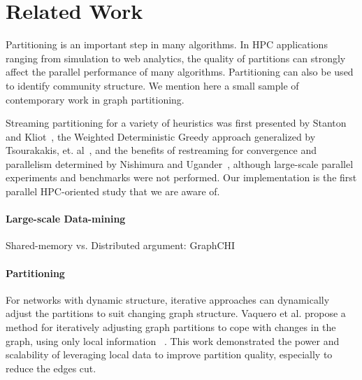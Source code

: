 \section{Related Work} \label{sec:rel}
Partitioning is an important step in many algorithms. In HPC applications ranging from simulation to web analytics, the quality of partitions can strongly affect the parallel performance of many algorithms. Partitioning can also be used to identify community structure. We mention here a small sample of contemporary work in graph partitioning.

Streaming partitioning for a variety of heuristics was first presented by Stanton and Kliot~\cite{Stanton:2012:SGP:2339530.2339722}, the Weighted Deterministic Greedy approach generalized by Tsourakakis, et. al~\cite{tsourakakis2012fennel}, and the benefits of restreaming for convergence and parallelism determined by Nishimura and Ugander~\cite{nishimura2013restream}, although large-scale parallel experiments and benchmarks were not performed. Our implementation is the first parallel HPC-oriented study that we are aware of. 

\paragraph{Large-scale Data-mining}
Shared-memory vs. Distributed argument: GraphCHI~\cite{graphchi}

\paragraph{Partitioning}

For networks with dynamic structure, iterative approaches can dynamically adjust the partitions to suit changing graph structure.
Vaquero et al. propose a method for iteratively adjusting graph partitions to cope with changes in the graph, using only local information ~\cite{Vaquero:2013:APL:2523616.2525943}.
This work demonstrated the power and scalability of leveraging local data to improve partition quality, especially to reduce the edges cut.

